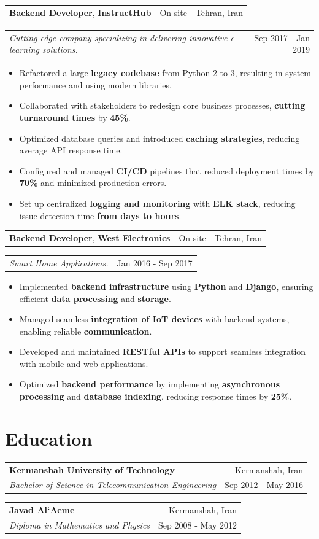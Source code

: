 \documentclass[letterpaper,11pt]{article}
\makeatletter
\newcommand{\resumeItemSimple}[1]{
  \item\small{
    {#1}
  }
}
\newcommand{\resumeSubheading}[4]{
  \vspace{-1pt}
    \begin{tabular*}{1\textwidth}[t]{l@{\extracolsep{\fill}}r}
      \textbf{#1} & #2 \\
      \textit{\small#3} & \small #4 \\
    \end{tabular*}
}
\newcommand{\resumeSubheadingSimple}[5]{
    \begin{tabular*}{1\textwidth}[t]{l@{\extracolsep{\fill}}r}
      \textbf{#1}, \textbf{\href{#3}{#2}} \space \small#4 & \small#5 \\
    \end{tabular*}
}
\newcommand{\resumeSubSubheading}[2]{
    \begin{tabular*}{1\textwidth}{l@{\extracolsep{\fill}}r}
      \textit{\small#1} & \small #2 \\
    \end{tabular*}\vspace{-1pt}
}
\newcommand{\resumeItemListStart}{\begin{itemize}[leftmargin=0.5cm, itemsep=1pt, parsep=0pt]} %
\newcommand{\resumeItemListEnd}{\end{itemize}}
\makeatother
\begin{document}
  \resumeSubheadingSimple
    {Backend Developer}{InstructHub}{}{}{On site - Tehran, Iran}
      \resumeSubSubheading{Cutting-edge company specializing in delivering innovative e-learning solutions.}{Sep 2017 - Jan 2019}
      \resumeItemListStart
        \resumeItemSimple{Refactored a large \textbf{legacy codebase} from Python 2 to 3, resulting in system performance and using modern libraries.}
        \resumeItemSimple{Collaborated with stakeholders to redesign core business processes, \textbf{cutting turnaround times} by \textbf{45\%}.}
        \resumeItemSimple{Optimized database queries and introduced \textbf{caching strategies}, reducing average API response time.}
        \resumeItemSimple{Configured and managed \textbf{CI/CD} pipelines that reduced deployment times by \textbf{70\%} and minimized production errors.}
        \resumeItemSimple{Set up centralized \textbf{logging and monitoring} with \textbf{ELK stack}, reducing issue detection time \textbf{from days to hours}.}
      \resumeItemListEnd

    \resumeSubheadingSimple
      {Backend Developer}{West Electronics}{}{}{On site - Tehran, Iran}
        \resumeSubSubheading{Smart Home Applications.}{Jan 2016 - Sep 2017}
        \resumeItemListStart
          \resumeItemSimple{Implemented \textbf{backend infrastructure} using \textbf{Python} and \textbf{Django}, ensuring efficient \textbf{data processing} and \textbf{storage}.}
          \resumeItemSimple{Managed seamless \textbf{integration of IoT devices} with backend systems, enabling reliable \textbf{communication}.}
          \resumeItemSimple{Developed and maintained \textbf{RESTful APIs} to support seamless integration with mobile and web applications.}
          \resumeItemSimple{Optimized \textbf{backend performance} by implementing \textbf{asynchronous processing} and \textbf{database indexing}, reducing response times by \textbf{25\%}.}
        \resumeItemListEnd

\section{Education}
    \resumeSubheading
      {Kermanshah University of Technology}{Kermanshah, Iran}
      {Bachelor of Science in Telecommunication Engineering}{Sep 2012 - May 2016}
    \resumeSubheading
      {Javad Al`Aeme}{Kermanshah, Iran}
      {Diploma in Mathematics and Physics}{Sep 2008 - May 2012}
\end{document}
